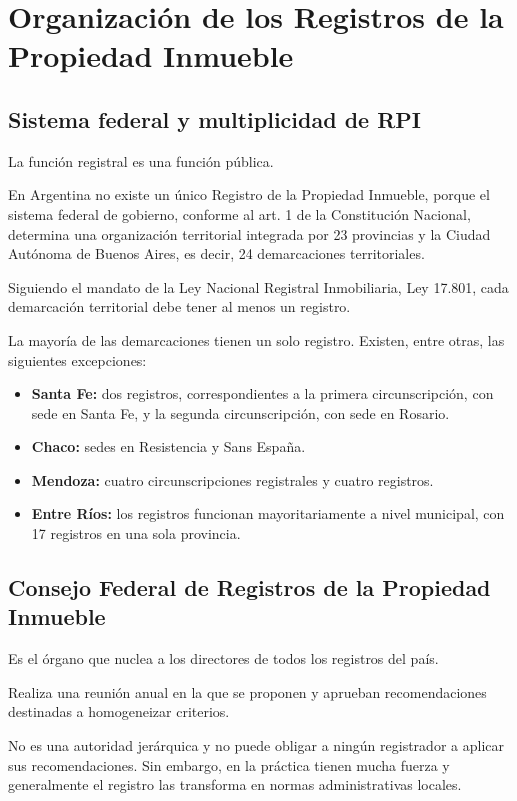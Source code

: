 \documentclass[12pt]{book}
\begin{document}
\chapter{Organizaci\'on de los Registros de la Propiedad Inmueble}

\section{Sistema federal y multiplicidad de RPI}

La funci\'on registral es una funci\'on p\'ublica.

En Argentina no existe un \'unico Registro de la Propiedad Inmueble, porque el sistema federal de gobierno, conforme al art. 1 de la Constituci\'on Nacional, determina una organizaci\'on territorial integrada por 23 provincias y la Ciudad Aut\'onoma de Buenos Aires, es decir, 24 demarcaciones territoriales.

Siguiendo el mandato de la Ley Nacional Registral Inmobiliaria, Ley 17.801, cada demarcaci\'on territorial debe tener al menos un registro.

La mayor\'ia de las demarcaciones tienen un solo registro. Existen, entre otras, las siguientes excepciones:

\begin{itemize}
    \item \textbf{Santa Fe:} dos registros, correspondientes a la primera circunscripci\'on, con sede en Santa Fe, y la segunda circunscripci\'on, con sede en Rosario.
    \item \textbf{Chaco:} sedes en Resistencia y Sans Espa\~na.
    \item \textbf{Mendoza:} cuatro circunscripciones registrales y cuatro registros.
    \item \textbf{Entre R\'ios:} los registros funcionan mayoritariamente a nivel municipal, con 17 registros en una sola provincia.
\end{itemize}

\section{Consejo Federal de Registros de la Propiedad Inmueble}

Es el \'organo que nuclea a los directores de todos los registros del pa\'is.

Realiza una reuni\'on anual en la que se proponen y aprueban recomendaciones destinadas a homogeneizar criterios.

No es una autoridad jer\'arquica y no puede obligar a ning\'un registrador a aplicar sus recomendaciones. Sin embargo, en la pr\'actica tienen mucha fuerza y generalmente el registro las transforma en normas administrativas locales.
\end{document}
